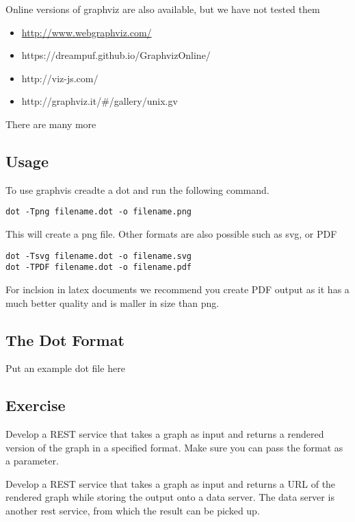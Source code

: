 Online versions of graphviz are also available, but we have not tested
them

\begin{itemize}
\item
  \url{http://www.webgraphviz.com/}
\item
  https://dreampuf.github.io/GraphvizOnline/
\item
  http://viz-js.com/
\item
  http://graphviz.it/\#/gallery/unix.gv
\end{itemize}

There are many more

\subsection{Usage}

To use graphvis creadte a dot and run the following command.

\begin{lstlisting}
dot -Tpng filename.dot -o filename.png
\end{lstlisting}

This will create a png file. Other formats are also possible such as
svg, or PDF

\begin{lstlisting}
dot -Tsvg filename.dot -o filename.svg
dot -TPDF filename.dot -o filename.pdf
\end{lstlisting}

For inclsion in latex documents we recommend you create PDF output as it
has a much better quality and is maller in size than png.

\subsection{The Dot Format}

Put an example dot file here

\subsection{Exercise}

\begin{exercise}
Develop a REST service that takes a graph as input and returns a rendered version of the graph in a specified format. Make sure you can pass the format as a parameter.
\end{exercise}

\begin{exercise}
Develop a REST service that takes a graph as input and returns a URL of the rendered graph while storing the output onto a data server. The data server is another rest service, from which the result can be picked up. 
\end{exercise}

